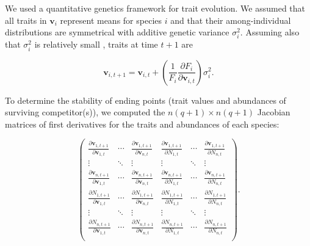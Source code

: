 We used a quantitative genetics framework for trait evolution.
We assumed that all traits in $\mathbf{v}_i$ represent means for species $i$
and that their among-individual distributions are symmetrical with additive
genetic variance $\sigma^2_i$.
Assuming also that $\sigma^2_i$ is relatively small
\citep{Iwasa:1991eo,Abrams:2001va,Abrams:1993cr}, traits at time $t+1$ are

\begin{equation} \label{eq:trait-change}
    \mathbf{v}_{i,t+1} = \mathbf{v}_{i,t} + \left( \frac{1}{F_i}
        \frac{\partial F_i}{\partial \mathbf{v}_{i,t}} \right) \sigma^2_i
    \textrm{.}
\end{equation}

To determine the stability of ending points (trait values and abundances of
surviving competitor(s)), we computed the $n (q+1) \times n (q+1)$ Jacobian matrices
of first derivatives for the traits and abundances of each species:

\begin{equation} \label{eq:jacobian}
    \begin{pmatrix}
        \frac{\partial \mathbf{v}_{1,t+1}}{\partial \mathbf{v}_{1,t}} & \cdots &
            \frac{\partial \mathbf{v}_{1,t+1}}{\partial \mathbf{v}_{n,t}} &
            \frac{\partial \mathbf{v}_{1,t+1}}{\partial N_{1,t}} & \cdots &
            \frac{\partial \mathbf{v}_{1,t+1}}{\partial N_{n,t}} \\
        \vdots & \ddots & \vdots & \vdots & \ddots & \vdots \\
        \frac{\partial \mathbf{v}_{n,t+1}}{\partial \mathbf{v}_{1,t}} & \cdots &
            \frac{\partial \mathbf{v}_{n,t+1}}{\partial \mathbf{v}_{n,t}} &
            \frac{\partial \mathbf{v}_{n,t+1}}{\partial N_{1,t}} & \cdots &
            \frac{\partial \mathbf{v}_{n,t+1}}{\partial N_{n,t}} \\[1ex]
%
%
        \frac{\partial N_{1,t+1}}{\partial \mathbf{v}_{1,t}} & \cdots &
            \frac{\partial N_{1,t+1}}{\partial \mathbf{v}_{n,t}} &
            \frac{\partial N_{1,t+1}}{\partial N_{1,t}} & \cdots &
            \frac{\partial N_{1,t+1}}{\partial N_{n,t}} \\
        \vdots & \ddots & \vdots & \vdots & \ddots & \vdots \\
        \frac{\partial N_{n,t+1}}{\partial \mathbf{v}_{1,t}} & \cdots &
            \frac{\partial N_{n,t+1}}{\partial \mathbf{v}_{n,t}} &
            \frac{\partial N_{n,t+1}}{\partial N_{1,t}} & \cdots &
            \frac{\partial N_{n,t+1}}{\partial N_{n,t}} \\
    \end{pmatrix}
    \text{.}
\end{equation}

